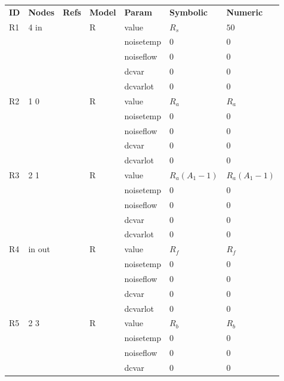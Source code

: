 \begin{table}[H]
\centering
\begin{tabular}[c]{lllllll}
\textbf{ID} & \textbf{Nodes} & \textbf{Refs} & \textbf{Model} & \textbf{Param} & \textbf{Symbolic} & \textbf{Numeric} \\ 
\rowcolor{myyellow}
\small{R1} &\small{4 in } & &\small{R} &\small{value} &$R_{s}$ &$50$ \\ 
 & & & &\small{noisetemp} &$0$ &$0$ \\ 
\rowcolor{myyellow}
 & & & &\small{noiseflow} &$0$ &$0$ \\ 
 & & & &\small{dcvar} &$0$ &$0$ \\ 
\rowcolor{myyellow}
 & & & &\small{dcvarlot} &$0$ &$0$ \\ 
\small{R2} &\small{1 0 } & &\small{R} &\small{value} &$R_{a}$ &$R_{a}$ \\ 
\rowcolor{myyellow}
 & & & &\small{noisetemp} &$0$ &$0$ \\ 
 & & & &\small{noiseflow} &$0$ &$0$ \\ 
\rowcolor{myyellow}
 & & & &\small{dcvar} &$0$ &$0$ \\ 
 & & & &\small{dcvarlot} &$0$ &$0$ \\ 
\rowcolor{myyellow}
\small{R3} &\small{2 1 } & &\small{R} &\small{value} &$R_{a} \left(A_{1} - 1\right)$ &$R_{a} \left(A_{1} - 1\right)$ \\ 
 & & & &\small{noisetemp} &$0$ &$0$ \\ 
\rowcolor{myyellow}
 & & & &\small{noiseflow} &$0$ &$0$ \\ 
 & & & &\small{dcvar} &$0$ &$0$ \\ 
\rowcolor{myyellow}
 & & & &\small{dcvarlot} &$0$ &$0$ \\ 
\small{R4} &\small{in out } & &\small{R} &\small{value} &$R_{f}$ &$R_{f}$ \\ 
\rowcolor{myyellow}
 & & & &\small{noisetemp} &$0$ &$0$ \\ 
 & & & &\small{noiseflow} &$0$ &$0$ \\ 
\rowcolor{myyellow}
 & & & &\small{dcvar} &$0$ &$0$ \\ 
 & & & &\small{dcvarlot} &$0$ &$0$ \\ 
\rowcolor{myyellow}
\small{R5} &\small{2 3 } & &\small{R} &\small{value} &$R_{b}$ &$R_{b}$ \\ 
 & & & &\small{noisetemp} &$0$ &$0$ \\ 
\rowcolor{myyellow}
 & & & &\small{noiseflow} &$0$ &$0$ \\ 
 & & & &\small{dcvar} &$0$ &$0$ \\ 

\end{tabular}
\end{table}

